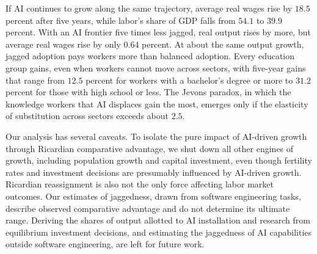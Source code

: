 \documentclass[11pt]{article}
\begin{document}
If AI continues to grow along the same trajectory, average real wages
rise by $18.5$ percent
after five years, while labor's share of GDP falls from $54.1$
to $39.9$ percent. With an
AI frontier five times less jagged, real output rises by more, but
average real wages rise by only $0.64$
percent. At about the same output growth, jagged adoption pays workers
more than balanced adoption. Every education group gains, even when
workers cannot move across sectors, with five-year gains that range
from $12.5$ percent for workers with a
bachelor's degree or more to $31.2$ percent
for those with high school or less. The Jevons paradox, in which the
knowledge workers that AI displaces gain the most, emerges only if
the elasticity of substitution across sectors exceeds about $2.5$.

Our analysis has several caveats. To isolate the pure impact of AI-driven
growth through Ricardian comparative advantage, we shut down all other
engines of growth, including population growth and capital investment,
even though fertility rates and investment decisions are presumably
influenced by AI-driven growth. Ricardian reassignment is also not
the only force affecting labor market outcomes. Our estimates of jaggedness,
drawn from software engineering tasks, describe observed comparative
advantage and do not determine its ultimate range. Deriving the shares
of output allotted to AI installation and research from equilibrium
investment decisions, and estimating the jaggedness of AI capabilities
outside software engineering, are left for future work. \label{main-text-end}

\begin{singlespace}




\end{singlespace}
\end{document}
